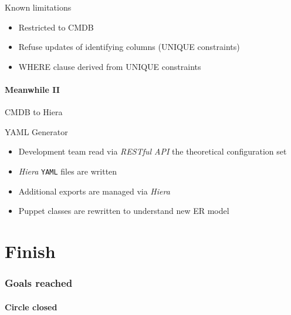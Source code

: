 \documentclass[ngerman,xcolor={table,dvipsnames},smaller,compress,hyperref={bookmarks,colorlinks}]{beamer}%
\begin{document}
\begin{frame}[fragile]{}
\begin{block}{Known limitations}
\begin{itemize}
\item Restricted to CMDB
\item<2-> Refuse updates of identifying columns (UNIQUE constraints)
\item<3-> WHERE clause derived from UNIQUE constraints
\end{itemize}
\end{block}
\end{frame}

\subsection{Meanwhile II}

\begin{frame}[fragile]{CMDB to Hiera}
\begin{block}{YAML Generator}
\begin{itemize}
\item Development team read via \textit{RESTful API} the theoretical configuration set
\item<2-> \textit{Hiera} \texttt{YAML} files are written
\item<3-> Additional exports are managed via \textit{Hiera}
\item<4-> Puppet classes are rewritten to understand new ER model
\end{itemize}
\end{block}
\end{frame}



\part{Finish}

\section{Goals reached}

\subsection{Circle closed}
\end{document}
